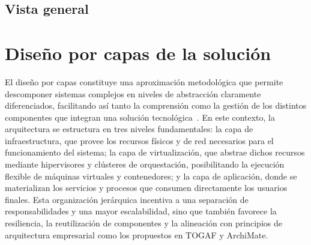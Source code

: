 \subsection{Vista general}
\noindent


\section{Diseño por capas de la solución}
\noindent
El diseño por capas constituye una aproximación metodológica que permite descomponer sistemas complejos en niveles de abstracción claramente diferenciados, facilitando así tanto la comprensión como la gestión de los distintos componentes que integran una solución tecnológica~\citep{Spray2023}. En este contexto, la arquitectura se estructura en tres niveles fundamentales: la capa de infraestructura, que provee los recursos físicos y de red necesarios para el funcionamiento del sistema; la capa de virtualización, que abstrae dichos recursos mediante hipervisores y clústeres de orquestación, posibilitando la ejecución flexible de máquinas virtuales y contenedores; y la capa de aplicación, donde se materializan los servicios y procesos que consumen directamente los usuarios finales. Esta organización jerárquica incentiva a una separación de responsabilidades y una mayor escalabilidad, sino que también favorece la resiliencia, la reutilización de componentes y la alineación con principios de arquitectura empresarial como los propuestos en TOGAF y ArchiMate.
